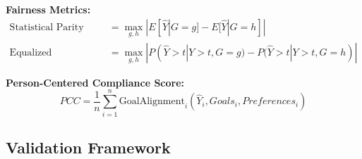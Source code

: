 \documentclass[12pt]{article}
\begin{document}
\textbf{Fairness Metrics:}
\begin{align}
\text{Statistical Parity} &= \max_{g,h} |E[\hat{Y}|G=g] - E[\hat{Y}|G=h]| \\
\text{Equalized Opportunity} &= \max_{g,h} |P(\hat{Y}>t|Y>t,G=g) - P(\hat{Y}>t|Y>t,G=h)|
\end{align}

\textbf{Person-Centered Compliance Score:}
\begin{equation}
PCC = \frac{1}{n}\sum_{i=1}^{n} \text{GoalAlignment}_i(\hat{Y}_i, Goals_i, Preferences_i)
\end{equation}

\subsection{Validation Framework}
\end{document}

